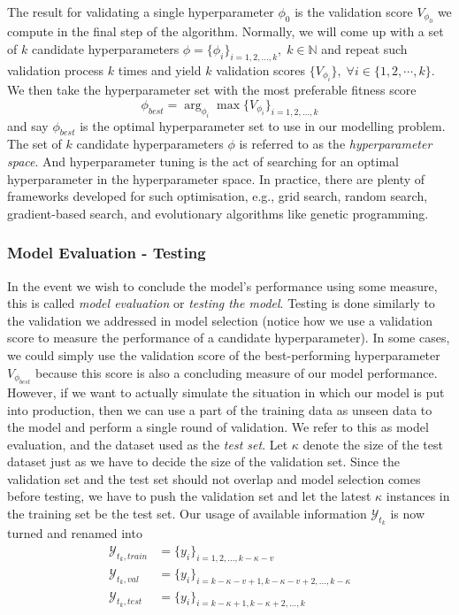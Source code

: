 The result for validating a single hyperparameter $\phi_0$ is the validation score $V_{\phi_0}$ we compute in the final step of the algorithm. Normally, we will come up with a set of $k$ candidate hyperparameters $\phi = \{ \phi_i \}_{i = 1, 2, \ldots, k}, \; k \in \mathbb{N}$ and repeat such validation process $k$ times and yield $k$ validation scores $\{ V_{\phi_i} \}, \; \forall i \in \{1, 2, \cdots, k \}$. We then take the hyperparameter set with the most preferable fitness score
\begin{equation*} 
    \phi_{best} = \arg_{\phi_i} \max \{ V_{\phi_i} \}_{i = 1, 2, \ldots, k}
\end{equation*}
and say $\phi_{best}$ is the optimal hyperparameter set to use in our modelling problem. The set of $k$ candidate hyperparameters $\phi$ is referred to as the \textit{hyperparameter space}. And hyperparameter tuning is the act of searching for an optimal hyperparameter in the hyperparameter space. In practice, there are plenty of frameworks developed for such optimisation, e.g., grid search, random search, gradient-based search, and evolutionary algorithms like genetic programming.

\subsubsection{Model Evaluation - Testing}
In the event we wish to conclude the model's performance using some measure, this is called \textit{model evaluation} or \textit{testing the model}. Testing is done similarly to the validation we addressed in model selection (notice how we use a validation score to measure the performance of a candidate hyperparameter). In some cases, we could simply use the validation score of the best-performing hyperparameter $V_{\phi_{best}}$ because this score is also a concluding measure of our model performance. However, if we want to actually simulate the situation in which our model is put into production, then we can use a part of the training data as unseen data to the model and perform a single round of validation. We refer to this as model evaluation, and the dataset used as the \textit{test set}. Let $\kappa$ denote the size of the test dataset just as we have to decide the size of the validation set. Since the validation set and the test set should not overlap and model selection comes before testing, we have to push the validation set and let the latest $\kappa$ instances in the training set be the test set. Our usage of available information $\mathcal{Y}_{t_k}$ is now turned and renamed into
\begin{align*}
    \mathcal{Y}_{t_k, train} &= \{y_i \}_{i = 1, 2, \ldots, k - \kappa - v}                 \\
    \mathcal{Y}_{t_k, val} &= \{y_i \}_{i = k-\kappa-v+1,k-\kappa-v+2, \ldots, k-\kappa}  \\
    \mathcal{Y}_{t_k, test} &= \{y_i \}_{i = k-\kappa+1,k-\kappa+2, \ldots, k}
\end{align*}

